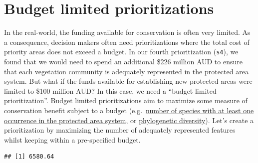 \documentclass[12pt,]{book}
\newenvironment{Shaded}{\begin{snugshade}}{\end{snugshade}}
\newcommand{\CommentTok}[1]{\textcolor[rgb]{0.56,0.35,0.01}{\textit{#1}}}
\newcommand{\DecValTok}[1]{\textcolor[rgb]{0.00,0.00,0.81}{#1}}
\newcommand{\KeywordTok}[1]{\textcolor[rgb]{0.13,0.29,0.53}{\textbf{#1}}}
\newcommand{\NormalTok}[1]{#1}
\newcommand{\OperatorTok}[1]{\textcolor[rgb]{0.81,0.36,0.00}{\textbf{#1}}}
\newcommand{\StringTok}[1]{\textcolor[rgb]{0.31,0.60,0.02}{#1}}
\begin{document}
\clearpage

\hypertarget{budget-limited-prioritizations}{%
\section{Budget limited prioritizations}\label{budget-limited-prioritizations}}

In the real-world, the funding available for conservation is often very limited. As a consequence, decision makers often need prioritizations where the total cost of priority areas does not exceed a budget. In our fourth prioritization (\texttt{s4}), we found that we would need to spend an additional \$226 million AUD to ensure that each vegetation community is adequately represented in the protected area system. But what if the funds available for establishing new protected areas were limited to \$100 million AUD? In this case, we need a ``budget limited prioritization''. Budget limited prioritizations aim to maximize some measure of conservation benefit subject to a budget (e.g.~\href{https://prioritizr.net/reference/add_max_cover_objective.html}{number of species with at least one occurrence in the protected area system}, or \href{https://prioritizr.net/reference/add_max_phylo_div_objective.html}{phylogenetic diversity}). Let's create a prioritization by maximizing the number of adequately represented features whilst keeping within a pre-specified budget.

\begin{Shaded}
\end{Shaded}

\begin{verbatim}
## [1] 6580.64
\end{verbatim}
\end{document}
